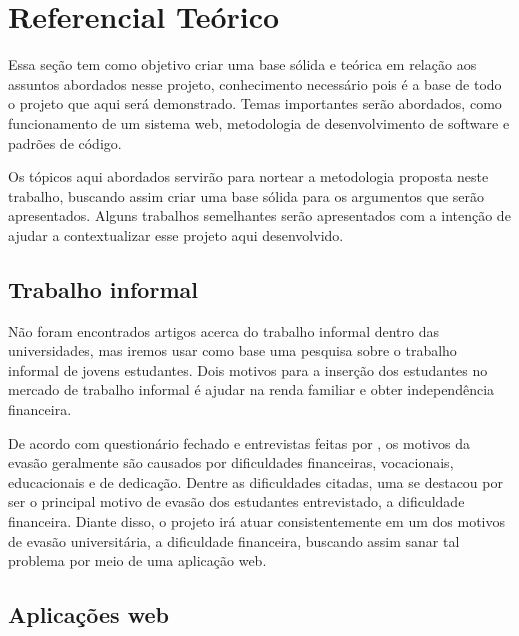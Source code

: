 \chapter{Referencial Teórico}

Essa seção tem como objetivo criar uma base sólida e teórica em relação aos assuntos abordados nesse projeto, conhecimento necessário pois é a base de todo o projeto que aqui será demonstrado. Temas importantes serão abordados, como funcionamento de um sistema web, metodologia de desenvolvimento de software e padrões de código. \par
Os tópicos aqui abordados servirão para nortear a metodologia proposta neste trabalho, buscando assim criar uma base sólida para os argumentos que serão apresentados. Alguns trabalhos semelhantes serão apresentados com a intenção de ajudar a contextualizar esse projeto aqui desenvolvido.


\section{Trabalho informal}\label{trabalho_informal}
Não foram encontrados artigos acerca do trabalho informal dentro das universidades, mas iremos usar como base uma pesquisa sobre o trabalho informal de jovens estudantes. Dois motivos para a inserção dos estudantes no mercado de trabalho informal é ajudar na renda familiar e obter independência financeira\cite{ferreira2009trabalhojovem}. \par
De acordo com questionário fechado e entrevistas feitas por \cite{ribeiro2005evasao}, os motivos da evasão geralmente são causados por dificuldades financeiras, vocacionais, educacionais e de dedicação. Dentre as dificuldades citadas, uma se destacou por ser o principal motivo de evasão dos estudantes entrevistado, a dificuldade financeira. Diante disso, o projeto irá atuar consistentemente em um dos motivos de evasão universitária, a dificuldade financeira, buscando assim sanar tal problema por meio de uma aplicação web.

\section{Aplicações web}
\label{sec:trabalhos_correlatos}

